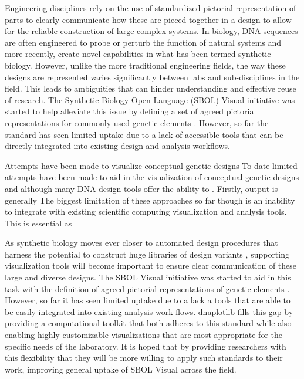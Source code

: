 \documentclass{bioinfo}
\begin{document}
Engineering disciplines rely on the use of standardized pictorial representation of parts to clearly communicate how these are pieced together in a design to allow for the reliable construction of large complex systems. In biology, DNA sequences are often engineered to probe or perturb the function of natural systems and more recently, create novel capabilities in what has been termed synthetic biology. However, unlike the more traditional engineering fields, the way these designs are represented varies significantly between labs and sub-disciplines in the field. This leads to ambiguities that can hinder understanding and effective reuse of research. The Synthetic Biology Open Language (SBOL) Visual initiative was started to help alleviate this issue by defining a set of agreed pictorial representations for commonly used genetic elements \citep{Quinn13a}. However, so far the standard has seen limited uptake due to a lack of accessible tools that can be directly integrated into existing design and analysis workflows.



Attempts have been made to visualize conceptual genetic designs 
To date limited attempts have been made to aid in the visualization of conceptual genetic designs \citep{Bhatia13a} and although many DNA design tools offer the ability to . Firstly, output is generally 
The biggest limitation of these approaches so far though is an inability to integrate with existing scientific computing visualization and analysis tools. This is essential as 


As synthetic biology moves ever closer to automated design procedures that harness the potential to construct huge libraries of design variants \citep{Smanski14a,Bilitchenko11a}, supporting visualization tools will become important to ensure clear communication of these large and diverse designs. The SBOL Visual initiative was started to aid in this task with the definition of agreed pictorial representations of genetic elements \citep{Quinn13a}. However, so far it has seen limited uptake due to a lack a tools that are able to be easily integrated into existing analysis work-flows. dnaplotlib fills this gap by providing a computational toolkit that both adheres to this standard while also enabling highly customizable visualizations that are most appropriate for the specific needs of the laboratory. It is hoped that by providing researchers with this flexibility that they will be more willing to apply such standards to their work, improving general uptake of SBOL Visual across the field.
\end{document}
